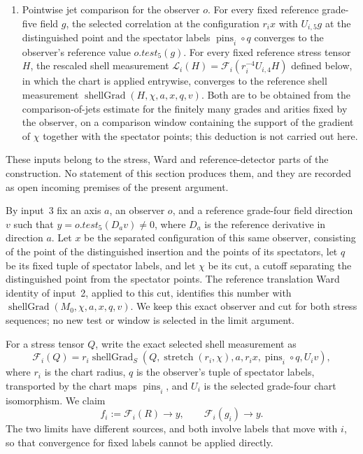 \begin{enumerate}
\begin{enumerate}
  field $D_a g$ in the distinguished slot equals the derivative in
  direction $a$, in the distinguished variable, of the correlation with
  $g$ in that slot.
 \item[(4d)] Pointwise jet comparison for the observer $o$. For every
  fixed reference grade-five field $g$, the selected correlation at the
  configuration $r_ix$ with $U_{i,5}g$ at the distinguished point and
  the spectator labels $\operatorname{pins}_i\circ q$ converges to the
  observer's reference value $o.test_5(g)$. For every fixed reference
  stress tensor $H$, the rescaled shell measurement
  $\mathcal L_i(H)=\mathscr F_i(r_i^{-4}U_{i,4}H)$ defined below, in
  which the chart is applied entrywise, converges to the reference shell
  measurement $\operatorname{shellGrad}(H,\chi,a,x,q,v)$. Both are to
  be obtained from the comparison-of-jets estimate for the finitely
  many grades and arities fixed by the observer, on a comparison window
  containing the support of the gradient of $\chi$ together with the
  spectator points; this deduction is not carried out here.
 \end{enumerate}
\end{enumerate}
These inputs belong to the stress, Ward and reference-detector parts of
the construction. No statement of this section produces them, and they
are recorded as open incoming premises of the present argument.

By input~3 fix an axis $a$, an
observer $o$, and a reference grade-four field direction $v$ such that
$y=o.test_5(D_a v)\ne0$, where $D_a$ is the reference derivative in direction
$a$. Let $x$ be the separated configuration of this same observer,
consisting of the point of the distinguished insertion and the points of
its spectators, let $q$ be its fixed tuple of spectator labels, and let
$\chi$ be its cut, a cutoff separating the distinguished point from the
spectator points. The reference translation Ward identity of input~2, applied to
this cut, identifies this number with
$\operatorname{shellGrad}(M_0,\chi,a,x,q,v)$. We keep this exact observer and
cut for both stress sequences; no new test or window is selected in the
limit argument.

For a stress tensor $Q$, write the exact selected shell measurement as
\[
 \mathscr F_i(Q)=r_i\operatorname{shellGrad}_S\!\left(
 Q,\operatorname{stretch}(r_i,\chi),a,r_i x,
 \operatorname{pins}_i\circ q,U_i v\right),
\]
where $r_i$ is the chart radius, $q$ is the observer's tuple of spectator
labels, transported by the chart maps $\operatorname{pins}_i$,
and $U_i$ is the selected grade-four chart isomorphism. We claim
\begin{equation}
 f_i:=\mathscr F_i(R)\to y,
 \qquad \mathscr F_i(g_i)\to y.
 \label{eq:ex-lattice-scribe-common-test}
\end{equation}
The two limits have different sources, and both involve labels that
move with $i$, so that convergence for fixed labels cannot be applied
directly.

